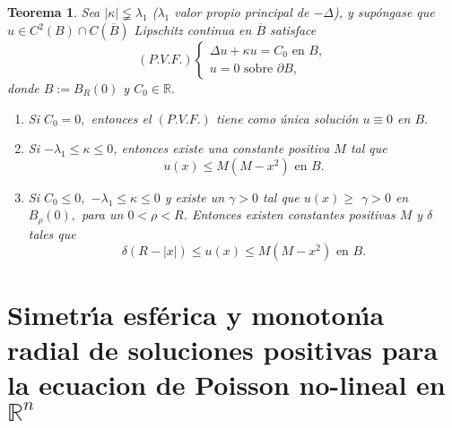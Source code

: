 \documentclass{article}
\newtheorem{theorem}{Teorema}
\begin{document}
\begin{theorem}
Sea $\left\vert \kappa \right\vert \lneqq \lambda _{1}$ ($\lambda _{1}$
valor propio principal de $-\Delta $), y sup\'{o}ngase que \linebreak $u\in
C^{2}\left( B\right) \cap C(\overline{B})$ Lipschitz continua en $\overline{B%
}$ satisface 
\begin{equation*}
\left( P.V.F.\right) \left\{ 
\begin{array}{c}
\Delta u+\kappa u=C_{0}\text{ \ \ en }B, \\ 
u=0\text{ \ \ sobre }\partial B,
\end{array}
\right.
\end{equation*}
donde $B:=B_{R}\left( 0\right) $ y $C_{0}\in \mathbb{R}.$

\begin{enumerate}
\item  Si $C_{0}=0,$ entonces el $\left( P.V.F.\right) $ tiene como
\'{u}nica soluci\'{o}n $u\equiv 0$ en $B.$

\item  Si $-\lambda _{1}\leq \kappa \leq 0$, entonces existe una constante
positiva $M$ tal que 
\begin{equation*}
u\left( x\right) \leq M\left( M-x^{2}\right) \text{ \ \ en }B\text{.}
\end{equation*}

\item  Si $C_{0}\leq 0,$ $-\lambda _{1}\leq \kappa \leq 0$ y existe un $%
\gamma >0$ tal que $u(x)\geq $ $\gamma >0$ en $B_{\rho }\left( 0\right) ,$
para un $0<\rho <R$. Entonces existen constantes positivas $M$ y $\delta $
tales que 
\begin{equation*}
\delta \left( R-\left\vert x\right\vert \right) \leq u\left( x\right) \leq
M\left( M-x^{2}\right) \text{ \ \ en }B\text{.}
\end{equation*}
\end{enumerate}
\end{theorem}

\section{Simetr\'{\i}a esf\'{e}rica y monoton\'{\i}a radial de soluciones
positivas para la ecuacion de Poisson no-lineal en $\mathbb{R}^{n}$}
\end{document}
